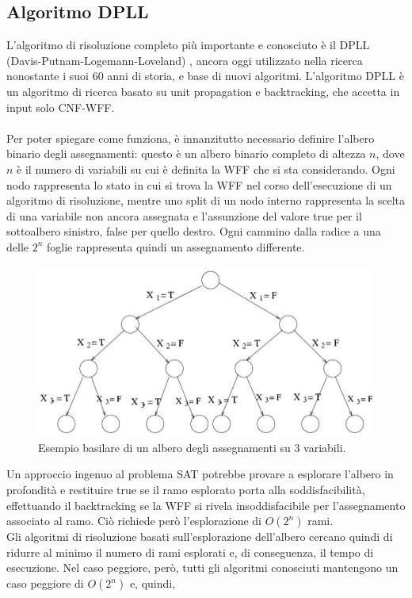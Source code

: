 \subsection{Algoritmo DPLL}
L'algoritmo di risoluzione completo più importante e conosciuto è il DPLL (Davis-Putnam-Logemann-Loveland) \cite{dp-algo} \cite{algo-dpll}, 
ancora oggi utilizzato nella ricerca nonostante i suoi 60 anni di storia, e base di nuovi algoritmi.
L'algoritmo DPLL è un algoritmo di ricerca basato su unit propagation e backtracking, che accetta in input solo CNF-WFF.\\
\\
Per poter spiegare come funziona, è innanzitutto necessario definire l'albero binario degli assegnamenti:
questo è un albero binario completo di altezza $n$, dove $n$ è il numero di variabili su cui è definita la WFF che si
sta considerando.
Ogni nodo rappresenta lo stato in cui si trova la WFF nel corso dell'esecuzione di un algoritmo di risoluzione,
mentre uno split di un nodo interno rappresenta la scelta di una variabile non ancora assegnata e l'assunzione del 
valore true per il sottoalbero sinistro, false per quello destro.
Ogni cammino dalla radice a una delle $2^n$ foglie rappresenta quindi un assegnamento differente.
\begin{figure}[H]
    \centering
    \includegraphics[width=0.7\linewidth]{images/assignment_tree.jpg}
    \caption{Esempio basilare di un albero degli assegnamenti su 3 variabili.}
    \label{fig:assignment_tree}
\end{figure}
Un approccio ingenuo al problema SAT potrebbe provare a esplorare l'albero in profondità
e restituire true se il ramo esplorato porta alla soddisfacibilità, effettuando il backtracking se la WFF si rivela insoddisfacibile per l'assegnamento associato al ramo. Ciò richiede però l'esplorazione di $O(2^n)$ rami. \\
Gli algoritmi di risoluzione basati sull'esplorazione dell'albero cercano quindi di ridurre al minimo il numero di rami esplorati e, di conseguenza, il tempo di 
esecuzione. Nel caso peggiore, però, tutti gli algoritmi conosciuti mantengono un caso peggiore di $O(2^n)$ e, quindi,
